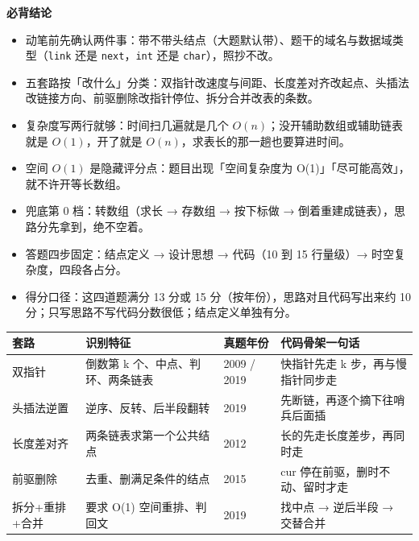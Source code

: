 \documentclass[10pt,a4paper]{ctexart}
\begin{document}


\textbf{必背结论}

\begin{itemize}

\item 动笔前先确认两件事：带不带头结点（大题默认带）、题干的域名与数据域类型（\texttt{link} 还是 \texttt{next}，\texttt{int} 还是 \texttt{char}），照抄不改。

\item 五套路按「改什么」分类：双指针改速度与间距、长度差对齐改起点、头插法改链接方向、前驱删除改指针停位、拆分合并改表的条数。

\item 复杂度写两行就够：时间扫几遍就是几个 $O(n)$；没开辅助数组或辅助链表就是 $O(1)$，开了就是 $O(n)$，求表长的那一趟也要算进时间。

\item 空间 $O(1)$ 是隐藏评分点：题目出现「空间复杂度为 O(1)」「尽可能高效」，就不许开等长数组。

\item 兜底第 0 档：转数组（求长 → 存数组 → 按下标做 → 倒着重建成链表），思路分先拿到，绝不空着。

\item 答题四步固定：结点定义 → 设计思想 → 代码（10 到 15 行量级）→ 时空复杂度，四段各占分。

\item 得分口径：这四道题满分 13 分或 15 分（按年份），思路对且代码写出来约 10 分；只写思路不写代码分数很低；结点定义单独有分。

\end{itemize}

\begin{center}\small
\begin{tabularx}{\linewidth}{@{}l>{\raggedright\arraybackslash}Xl>{\raggedright\arraybackslash}X@{}}
\toprule
套路 & 识别特征 & 真题年份 & 代码骨架一句话 \\
\midrule
双指针 & 倒数第 k 个、中点、判环、两条链表 & 2009 / 2019 & 快指针先走 k 步，再与慢指针同步走 \\
头插法逆置 & 逆序、反转、后半段翻转 & 2019 & 先断链，再逐个摘下往哨兵后面插 \\
长度差对齐 & 两条链表求第一个公共结点 & 2012 & 长的先走长度差步，再同时走 \\
前驱删除 & 去重、删满足条件的结点 & 2015 & cur 停在前驱，删时不动、留时才走 \\
拆分+重排+合并 & 要求 O(1) 空间重排、判回文 & 2019 & 找中点 → 逆后半段 → 交替合并 \\
\bottomrule
\end{tabularx}
\end{center}
\end{document}
